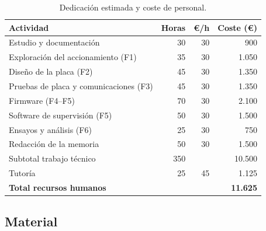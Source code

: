 \begin{table}[H]
\centering
\caption{Dedicación estimada y coste de personal.}
\label{tab:horas}
\begin{tabular}{@{}lrrr@{}}
\toprule
Actividad & Horas & €/h & Coste (€) \\
\midrule
Estudio y documentación & 30 & 30 & 900 \\
Exploración del accionamiento (F1) & 35 & 30 & 1.050 \\
Diseño de la placa (F2) & 45 & 30 & 1.350 \\
Pruebas de placa y comunicaciones (F3) & 45 & 30 & 1.350 \\
Firmware (F4--F5) & 70 & 30 & 2.100 \\
Software de supervisión (F5) & 50 & 30 & 1.500 \\
Ensayos y análisis (F6) & 25 & 30 & 750 \\
Redacción de la memoria & 50 & 30 & 1.500 \\
\midrule
Subtotal trabajo técnico & 350 & & 10.500 \\
Tutoría & 25 & 45 & 1.125 \\
\midrule
\textbf{Total recursos humanos} & & & \textbf{11.625} \\
\bottomrule
\end{tabular}
\end{table}

\subsection{Material}

